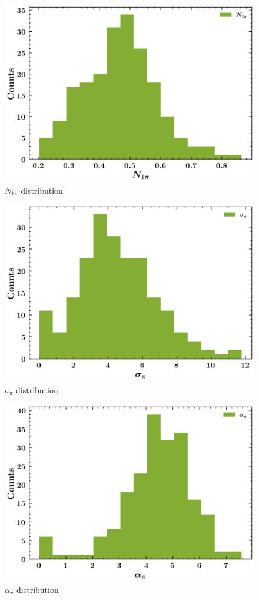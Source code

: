 \documentclass[]{article}
\begin{document}
\begin{figure}
\centering
\includegraphics{pngplots/param0.png}
\caption{\(N_{1\pi}\) distribution}
\end{figure}

\begin{figure}
\centering
\includegraphics{pngplots/param1.png}
\caption{\(\sigma_\pi\) distribution}
\end{figure}

\begin{figure}
\centering
\includegraphics{pngplots/param2.png}
\caption{\(\alpha_\pi\) distribution}
\end{figure}
\end{document}
